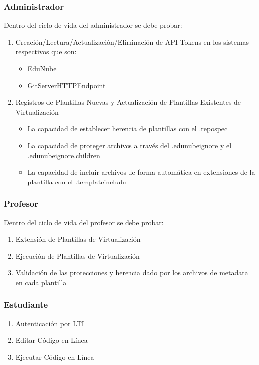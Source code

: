 \subsubsection{Administrador}
Dentro del ciclo de vida del administrador se debe probar:
\begin{enumerate}
  \item Creación/Lectura/Actualización/Eliminación de API Tokens en los sistemas respectivos que son:
  \begin{itemize}
    \item EduNube
    \item GitServerHTTPEndpoint
  \end{itemize}
  \item Registros de Plantillas Nuevas y Actualización de Plantillas Existentes de Virtualización
  \begin{itemize}
    \item La capacidad de establecer herencia de plantillas con el .repospec
    \item La capacidad de proteger archivos a través del  .edunubeignore y el .edunubeignore.children
    \item La capacidad de incluir archivos de forma automática en extensiones de la plantilla con el .templateinclude
  \end{itemize}
\end{enumerate}

\subsubsection{Profesor}
Dentro del ciclo de vida del profesor se debe probar:
\begin{enumerate}
  \item Extensión de Plantillas de Virtualización
  \item Ejecución de Plantillas de Virtualización
  \item Validación de las protecciones y herencia dado por los archivos de metadata en cada plantilla
\end{enumerate}

\subsubsection{Estudiante}
\begin{enumerate}
  \item Autenticación por LTI
  \item Editar Código en Línea
  \item Ejecutar Código en Línea
\end{enumerate}

